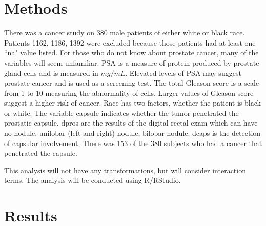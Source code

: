 \documentclass{article}\usepackage[]{graphicx}\usepackage[]{color}
\begin{document}
\section{Methods}
\qquad There was a cancer study on 380 male patients of either white or black race. Patients 1162, 1186, 1392 were excluded because those patients had at least one ``na" value listed. For those who do not know about prostate cancer, many of the variables will seem unfamiliar. PSA is a measure of protein produced by prostate gland cells and is measured in $mg/mL$. Elevated levels of PSA may suggest prostate cancer and is used as a screening test. The total Gleason score is a scale from 1 to 10 measuring the abnormality of cells. Larger values of Gleason score suggest a higher risk of cancer. Race has two factors, whether the patient is black or white. The variable capsule indicates whether the tumor penetrated the prostatic capsule. dpros are the results of the digital rectal exam which can have no nodule, unilobar (left and right) nodule, bilobar nodule. dcaps is the detection of capsular involvement. There was 153 of the 380 subjects who had a cancer that penetrated the capsule. 

\qquad This analysis will not have any transformations, but will consider interaction terms. 
The analysis will be conducted using R/RStudio. 

\section{Results}
\end{document}
